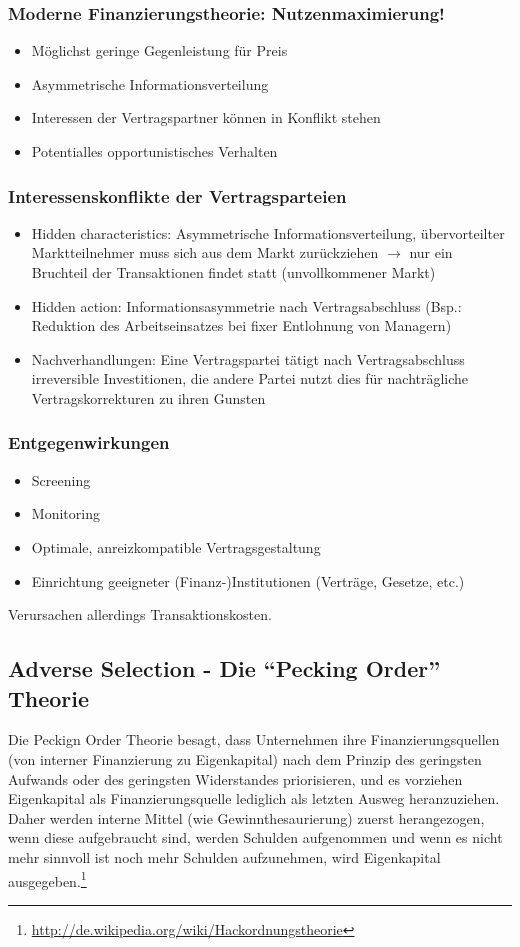 \subsubsection{Moderne Finanzierungstheorie: Nutzenmaximierung!}
\begin{itemize}
	\item Möglichst geringe Gegenleistung für Preis
	\item Asymmetrische Informationsverteilung
	\item Interessen der Vertragspartner können in Konflikt stehen
	\item Potentialles opportunistisches Verhalten
\end{itemize}

\subsubsection{Interessenskonflikte der Vertragsparteien}
\begin{itemize}
	\item Hidden characteristics: Asymmetrische Informationsverteilung, übervorteilter Marktteilnehmer muss sich aus dem Markt zurückziehen $\rightarrow$ nur ein Bruchteil der Transaktionen findet statt (unvollkommener Markt)
	\item Hidden action: Informationsasymmetrie nach Vertragsabschluss (Bsp.: Reduktion des Arbeitseinsatzes bei fixer Entlohnung von Managern)
	\item Nachverhandlungen: Eine Vertragspartei tätigt nach Vertragsabschluss irreversible Investitionen, die andere Partei nutzt dies für nachträgliche Vertragskorrekturen zu ihren Gunsten
\end{itemize}

\subsubsection{Entgegenwirkungen}
\begin{itemize}
	\item Screening
	\item Monitoring
	\item Optimale, anreizkompatible Vertragsgestaltung
	\item Einrichtung geeigneter (Finanz-)Institutionen (Verträge, Gesetze, etc.)
\end{itemize}
Verursachen allerdings Transaktionskosten.


\subsection{Adverse Selection - Die "`Pecking Order"' Theorie}
Die Peckign Order Theorie besagt, dass Unternehmen ihre Finanzierungsquellen (von interner Finanzierung zu Eigenkapital) nach dem Prinzip des geringsten Aufwands oder des geringsten Widerstandes priorisieren, und es vorziehen Eigenkapital als Finanzierungsquelle lediglich als letzten Ausweg heranzuziehen. Daher werden interne Mittel (wie Gewinnthesaurierung) zuerst herangezogen, wenn diese aufgebraucht sind, werden Schulden aufgenommen und wenn es nicht mehr sinnvoll ist noch mehr Schulden aufzunehmen, wird Eigenkapital ausgegeben.\footnote{\url{http://de.wikipedia.org/wiki/Hackordnungstheorie}}



